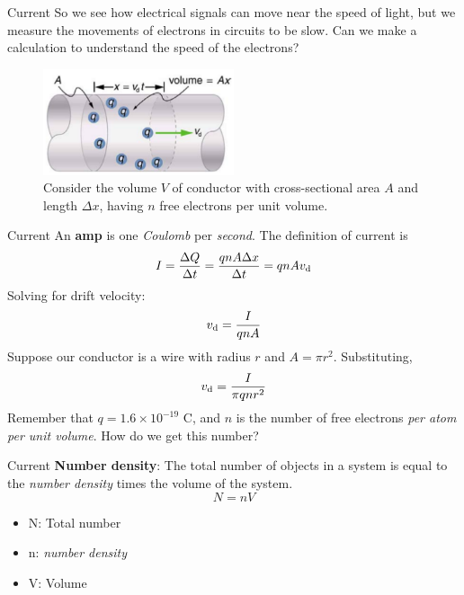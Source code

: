 \documentclass{beamer}
\begin{document}
\begin{frame}{Current}
So we see how electrical signals can move near the speed of light, but we measure the movements of electrons in circuits to be slow.  Can we make a calculation to understand the speed of the electrons? \\ \vspace{0.5cm}
\begin{figure}
\includegraphics[width=0.5\textwidth]{figures/current3.png}
\caption{\label{fig:current3} Consider the volume $V$ of conductor with cross-sectional area $A$ and length $\Delta x$, having $n$ free electrons per unit volume.}
\end{figure}
\end{frame}

\begin{frame}{Current}
An \textbf{amp} is one \textit{Coulomb} per \textit{second}.  The definition of current is
\begin{equation}
I = \frac{\Delta Q}{\Delta t} = \frac{qnA\Delta x}{\Delta t} = q n A v_{\rm d}
\end{equation}
Solving for drift velocity:
\begin{equation}
v_{\rm d} = \frac{I}{q n A}
\end{equation}
Suppose our conductor is a wire with radius $r$ and $A = \pi r^2$.  Substituting,
\begin{equation}
v_{\rm d} = \frac{I}{\pi q n r^2}
\end{equation}
Remember that $q = 1.6 \times 10^{-19}$ C, and $n$ is the number of free electrons \textit{per atom per unit volume}.  How do we get this number?
\end{frame}

\begin{frame}{Current}
\textbf{Number density}: The total number of objects in a system is equal to the \textit{number density} times the volume of the system.
\begin{equation}
N = nV
\end{equation}
\begin{itemize}
\item N: Total number
\item n: \textit{number density}
\item V: Volume
\end{itemize}
\end{frame}
\end{document}
